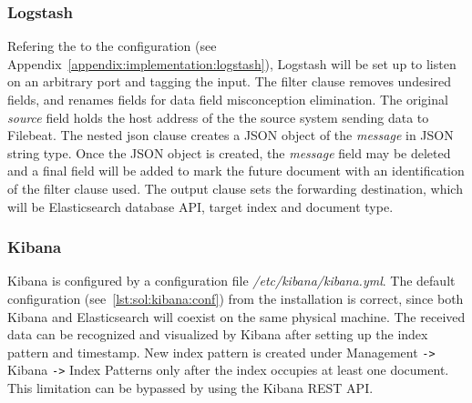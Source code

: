 \documentclass[12pt,a4paper,twoside]{report}
\begin{document}
			\subsubsection*{Logstash}
				Refering the to the configuration (see Appendix~\autoref{appendix:implementation:logstash}), Logstash will be set up to listen on an arbitrary port and tagging the input. The filter clause removes undesired fields, and renames fields for data field misconception elimination. The original \emph{source} field holds the host address of the the source system sending data to Filebeat. The nested json clause creates a JSON object of the \emph{message} in JSON string type. Once the JSON object is created, the \emph{message} field may be deleted and a final field will be added to mark the future document with an identification of the filter clause used. The output clause sets the forwarding destination, which will be Elasticsearch database API, target index and document type.
			\subsubsection*{Kibana}
				Kibana is configured by a configuration file \emph{/etc/kibana/kibana.yml}. The default configuration (see~\autoref{lst:sol:kibana:conf}) from the installation is correct, since both Kibana and Elasticsearch will coexist on the same physical machine. The received data can be recognized and visualized by Kibana after setting up the index pattern and timestamp. New index pattern is created under Management \texttt{->} Kibana \texttt{->} Index Patterns only after the index occupies at least one document. This limitation can be bypassed by using the Kibana REST API.
				
\end{document}
